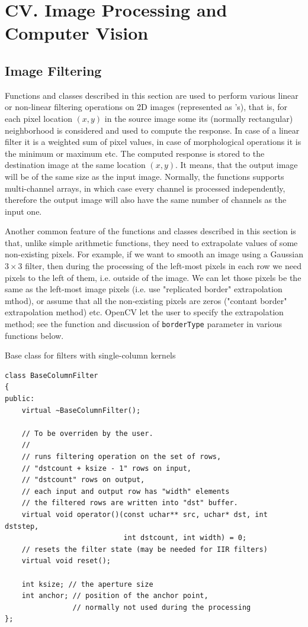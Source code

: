 \section{CV. Image Processing and Computer Vision}

\subsection{Image Filtering}\label{CV.Filtering}

Functions and classes described in this section are used to perform various linear or non-linear filtering operations on 2D images (represented as 's), that is, for each pixel location $(x,y)$ in the source image some its (normally rectangular) neighborhood is considered and used to compute the response. In case of a linear filter it is a weighted sum of pixel values, in case of morphological operations it is the minimum or maximum etc. The computed response is stored to the destination image at the same location $(x,y)$. It means, that the output image will be of the same size as the input image. Normally, the functions supports multi-channel arrays, in which case every channel is processed independently, therefore the output image will also have the same number of channels as the input one.

Another common feature of the functions and classes described in this section is that, unlike simple arithmetic functions, they need to extrapolate values of some non-existing pixels. For example, if we want to smooth an image using a Gaussian $3 \times 3$ filter, then during the processing of the left-most pixels in each row we need pixels to the left of them, i.e. outside of the image. We can let those pixels be the same as the left-most image pixels (i.e. use "replicated border" extrapolation mthod), or assume that all the non-existing pixels are zeros ("contant border" extrapolation method) etc. OpenCV let the user to specify the extrapolation method; see the function  and discussion of \texttt{borderType} parameter in various functions below.  

\label{BaseColumnFilter}
Base class for filters with single-column kernels

\begin{lstlisting}
class BaseColumnFilter
{
public:
    virtual ~BaseColumnFilter();
    
    // To be overriden by the user.
    //
    // runs filtering operation on the set of rows,
    // "dstcount + ksize - 1" rows on input,
    // "dstcount" rows on output,
    // each input and output row has "width" elements
    // the filtered rows are written into "dst" buffer.
    virtual void operator()(const uchar** src, uchar* dst, int dststep,
                            int dstcount, int width) = 0;
    // resets the filter state (may be needed for IIR filters)
    virtual void reset();
    
    int ksize; // the aperture size
    int anchor; // position of the anchor point,
                // normally not used during the processing
};
\end{lstlisting}


